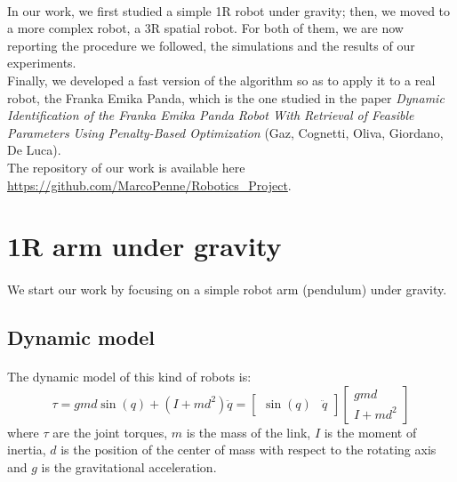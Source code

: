 \documentclass{article}
\begin{document}
\paragraph{}In our work, we first studied a simple 1R robot under gravity; then, we moved to a more complex robot, a 3R spatial robot. For both of them, we are now reporting the procedure we followed, the simulations and the results of our experiments.\\

Finally, we developed a fast version of the algorithm so as to apply it to a real robot, the Franka Emika Panda, which is the one studied in the paper \emph{Dynamic Identification of the Franka Emika Panda Robot With Retrieval of Feasible Parameters Using Penalty-Based Optimization} (Gaz, Cognetti, Oliva, Giordano, De Luca).\\

The repository of our work is available here \url{https://github.com/MarcoPenne/Robotics_Project}.

\section{1R arm under gravity}
\paragraph{}We start our work by focusing on a simple robot arm (pendulum) under gravity.
\subsection{Dynamic model}
\paragraph{} 
The dynamic model of this kind of robots is:
\[\tau=gmd \sin(q) + (I+md^2)\ddot{q}= \begin{bmatrix}
\sin(q) & \ddot{q}
\end{bmatrix}\begin{bmatrix}
gmd \\ I +md^2
\end{bmatrix}\]
where $\tau$ are the joint torques, $m$ is the mass of the link, $I$ is the moment of inertia, $d$ is the position of the center of mass with respect to the rotating axis and $g$ is the gravitational acceleration.
\end{document}
